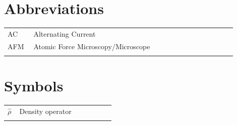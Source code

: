 \section{Abbreviations}



\noindent
\begin{longtable}{p{0.10\linewidth} p{0.80\linewidth} }
	AC & Alternating Current \\
	AFM	& Atomic Force Microscopy/Microscope \\
	\etc{} & \etc{} \\
\end{longtable}


\section{Symbols}
\noindent
\begin{longtable}{p{0.10\linewidth} p{0.80\linewidth} }
	$\hat{\rho}$ & Density operator \\
	\etc{} & \etc{} \\
\end{longtable}
\clearpage





